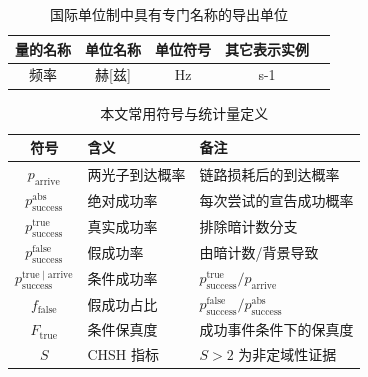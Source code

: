 \begin{denotation}
\begin{table}[h]%
\caption{国际单位制中具有专门名称的导出单位}
\vspace{0.5em}\centering\wuhao
\begin{tabular}{ccccc}
\toprule[1.5pt]
量的名称&单位名称&单位符号&其它表示实例\\
\midrule[1pt]
频率&赫[兹]&Hz&s-1\\
\bottomrule[1.5pt]
\end{tabular}
\end{table}

\begin{table}[h]
\caption{本文常用符号与统计量定义}
\vspace{0.5em}\centering\wuhao
\begin{tabular}{cll}
\toprule[1.5pt]
符号 & 含义 & 备注 \\
\midrule[1pt]
$p_{\mathrm{arrive}}$ & 两光子到达概率 & 链路损耗后的到达概率 \\
$p_{\mathrm{success}}^{\mathrm{abs}}$ & 绝对成功率 & 每次尝试的宣告成功概率 \\
$p_{\mathrm{success}}^{\mathrm{true}}$ & 真实成功率 & 排除暗计数分支 \\
$p_{\mathrm{success}}^{\mathrm{false}}$ & 假成功率 & 由暗计数/背景导致 \\
$p_{\mathrm{success}}^{\mathrm{true}\mid\mathrm{arrive}}$ & 条件成功率 & $p_{\mathrm{success}}^{\mathrm{true}}/p_{\mathrm{arrive}}$ \\
$f_{\mathrm{false}}$ & 假成功占比 & $p_{\mathrm{success}}^{\mathrm{false}}/p_{\mathrm{success}}^{\mathrm{abs}}$ \\
$F_{\mathrm{true}}$ & 条件保真度 & 成功事件条件下的保真度 \\
$S$ & CHSH 指标 & $S>2$ 为非定域性证据 \\
\bottomrule[1.5pt]
\end{tabular}
\end{table}
\end{denotation}
